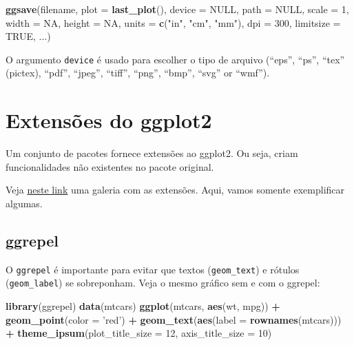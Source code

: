 \documentclass[]{book}
\newenvironment{Shaded}{\begin{snugshade}}{\end{snugshade}}
\newcommand{\KeywordTok}[1]{\textcolor[rgb]{0.13,0.29,0.53}{\textbf{#1}}}
\newcommand{\DataTypeTok}[1]{\textcolor[rgb]{0.13,0.29,0.53}{#1}}
\newcommand{\DecValTok}[1]{\textcolor[rgb]{0.00,0.00,0.81}{#1}}
\newcommand{\StringTok}[1]{\textcolor[rgb]{0.31,0.60,0.02}{#1}}
\newcommand{\OtherTok}[1]{\textcolor[rgb]{0.56,0.35,0.01}{#1}}
\newcommand{\OperatorTok}[1]{\textcolor[rgb]{0.81,0.36,0.00}{\textbf{#1}}}
\newcommand{\NormalTok}[1]{#1}
\begin{document}
\begin{Shaded}
\begin{Highlighting}[]
\KeywordTok{ggsave}\NormalTok{(filename, }\DataTypeTok{plot =} \KeywordTok{last_plot}\NormalTok{(), }\DataTypeTok{device =} \OtherTok{NULL}\NormalTok{, }\DataTypeTok{path =} \OtherTok{NULL}\NormalTok{,}
  \DataTypeTok{scale =} \DecValTok{1}\NormalTok{, }\DataTypeTok{width =} \OtherTok{NA}\NormalTok{, }\DataTypeTok{height =} \OtherTok{NA}\NormalTok{, }\DataTypeTok{units =} \KeywordTok{c}\NormalTok{(}\StringTok{"in"}\NormalTok{, }\StringTok{"cm"}\NormalTok{, }\StringTok{"mm"}\NormalTok{),}
  \DataTypeTok{dpi =} \DecValTok{300}\NormalTok{, }\DataTypeTok{limitsize =} \OtherTok{TRUE}\NormalTok{, ...)}
\end{Highlighting}
\end{Shaded}

O argumento \texttt{device} é usado para escolher o tipo de arquivo
(``eps'', ``ps'', ``tex'' (pictex), ``pdf'', ``jpeg'', ``tiff'',
``png'', ``bmp'', ``svg'' or ``wmf'').

\section{Extensões do ggplot2}\label{extensoes-do-ggplot2}

Um conjunto de pacotes fornece extensões ao ggplot2. Ou seja, criam
funcionalidades não existentes no pacote original.

Veja \href{http://www.ggplot2-exts.org/gallery/}{neste link} uma galeria
com as extensões. Aqui, vamos somente exemplificar algumas.

\subsection{ggrepel}\label{ggrepel}

O \texttt{ggrepel} é importante para evitar que textos
(\texttt{geom\_text}) e rótulos (\texttt{geom\_label}) se sobreponham.
Veja o mesmo gráfico sem e com o ggrepel:

\begin{Shaded}
\begin{Highlighting}[]
\KeywordTok{library}\NormalTok{(ggrepel)}
\KeywordTok{data}\NormalTok{(mtcars)}
\KeywordTok{ggplot}\NormalTok{(mtcars, }\KeywordTok{aes}\NormalTok{(wt, mpg)) }\OperatorTok{+}
\StringTok{  }\KeywordTok{geom_point}\NormalTok{(}\DataTypeTok{color =} \StringTok{'red'}\NormalTok{) }\OperatorTok{+}
\StringTok{  }\KeywordTok{geom_text}\NormalTok{(}\KeywordTok{aes}\NormalTok{(}\DataTypeTok{label =} \KeywordTok{rownames}\NormalTok{(mtcars))) }\OperatorTok{+}
\StringTok{  }\KeywordTok{theme_ipsum}\NormalTok{(}\DataTypeTok{plot_title_size =} \DecValTok{12}\NormalTok{,  }
              \DataTypeTok{axis_title_size =} \DecValTok{10}\NormalTok{)}
\end{Highlighting}
\end{Shaded}
\end{document}

